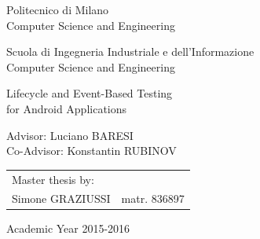 \documentclass[11pt,a4paper,notitlepage]{article}
\begin{document}
\sloppy


\begin{titlepage}
\vspace*{-2.5cm}
\bfseries
\begin{center}
  \LARGE
  Politecnico di Milano\\
  \Large
  Computer Science and Engineering\\


\begin{large}
Scuola di Ingegneria Industriale e dell'Informazione\\
Computer Science and Engineering\\
\end{large}

\vspace{2.0cm}
\begin{Large}
Lifecycle and Event-Based Testing\\for Android Applications
\end{Large}  
\end{center}

\vspace*{4cm}
\large
\begin{flushleft}
\hspace{-2cm}  Advisor: Luciano BARESI\\
\hspace{-2cm}  Co-Advisor: Konstantin RUBINOV\\
\end{flushleft}
\vspace*{1.5cm}

\hspace{6cm}
\parbox{10cm}{
    \begin{tabular}{ll}
         Master thesis by: & \\
         Simone GRAZIUSSI & matr. 836897\\
    \end{tabular}
}

\vspace*{2cm}
\begin{center}
  Academic Year 2015-2016
\end{center}

\end{titlepage}
\end{document}
